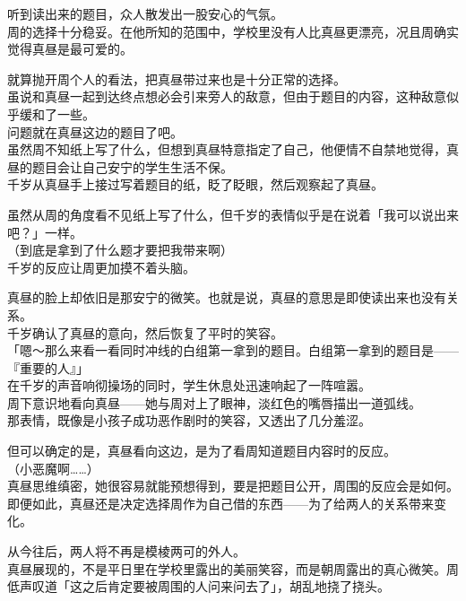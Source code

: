 听到读出来的题目，众人散发出一股安心的气氛。\\

周的选择十分稳妥。在他所知的范围中，学校里没有人比真昼更漂亮，况且周确实觉得真昼是最可爱的。

就算抛开周个人的看法，把真昼带过来也是十分正常的选择。\\

虽说和真昼一起到达终点想必会引来旁人的敌意，但由于题目的内容，这种敌意似乎缓和了一些。\\

问题就在真昼这边的题目了吧。\\

虽然周不知纸上写了什么，但想到真昼特意指定了自己，他便情不自禁地觉得，真昼的题目会让自己安宁的学生生活不保。\\

千岁从真昼手上接过写着题目的纸，眨了眨眼，然后观察起了真昼。

虽然从周的角度看不见纸上写了什么，但千岁的表情似乎是在说着「我可以说出来吧？」一样。\\

（到底是拿到了什么题才要把我带来啊）\\

千岁的反应让周更加摸不着头脑。

真昼的脸上却依旧是那安宁的微笑。也就是说，真昼的意思是即使读出来也没有关系。\\

千岁确认了真昼的意向，然后恢复了平时的笑容。\\

「嗯～那么来看一看同时冲线的白组第一拿到的题目。白组第一拿到的题目是——『重要的人』」\\

在千岁的声音响彻操场的同时，学生休息处迅速响起了一阵喧嚣。\\

周下意识地看向真昼——她与周对上了眼神，淡红色的嘴唇描出一道弧线。\\

那表情，既像是小孩子成功恶作剧时的笑容，又透出了几分羞涩。

但可以确定的是，真昼看向这边，是为了看周知道题目内容时的反应。\\

（小恶魔啊……）\\

真昼思维缜密，她很容易就能预想得到，要是把题目公开，周围的反应会是如何。\\

即便如此，真昼还是决定选择周作为自己借的东西——为了给两人的关系带来变化。

从今往后，两人将不再是模棱两可的外人。\\

真昼展现的，不是平日里在学校里露出的美丽笑容，而是朝周露出的真心微笑。周低声叹道「这之后肯定要被周围的人问来问去了」，胡乱地挠了挠头。
